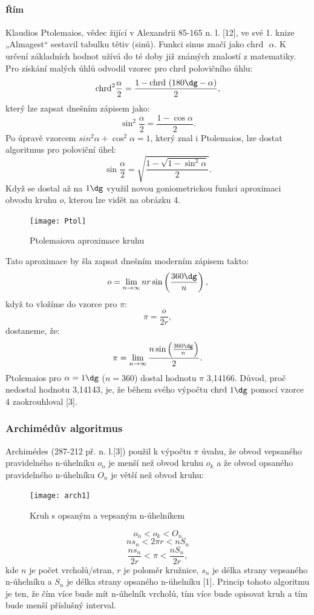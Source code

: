 \documentclass[rocnikovka]{gzwroc} %
\begin{document}
\paragraph{Řím}
Klaudios Ptolemaios, vědec žijící v Alexandrii 85-165 n. l. [12], ve své 1. knize „Almagest“ sestavil tabulku tětiv (sinů). Funkci sinus značí jako $\mathrm{chrd} \textrm{ }\alpha$. K určení základních hodnot užívá do té doby již známých znalostí z matematiky. Pro získání malých úhlů odvodil vzorec pro $\mathrm{chrd}$ polovičního úhlu:
$$
\mathrm{chrd}^2\frac{\alpha}{2}=\frac{1-\mathrm{chrd}\textrm{ }(180\dg-\alpha)}{2},
$$
který lze zapsat dnešním zápisem jako:
$$
\sin^2\frac{\alpha}{2}=\frac{1-\cos\alpha}{2}.
$$
Po úpravě vzorcem $sin^2\alpha+\cos^2\alpha=1$, který znal i Ptolemaios, lze dostat algoritmus pro poloviční úhel:
\begin{equation}
\sin\frac{\alpha}{2}=\sqrt{\frac{1-\sqrt{1-\sin^2\alpha}}{2}}.
\end{equation}
Když se dostal až na  $1\dg$ využil novou goniometrickou funkci aproximaci obvodu kruhu $o$, kterou lze vidět na obrázku 4.
\begin{figure}[!ht]
\texttt{[image: Ptol]}
\caption{Ptolemaiova aproximace kruhu}
\label{fig:kruh}
\end{figure}
Tato aproximace by šla zapsat dnešním moderním zápisem takto:
$$
o=\lim_{n\to\infty} nr\sin\left(\frac{360\dg}{n}\right),
$$
když to  vložíme do vzorce pro $\pi$:
$$
\pi=\frac{o}{2r},
$$
dostaneme, že:
\begin{equation}
\pi=\lim_{n\to\infty}\frac{n\sin\left(\frac{360\dg}{n}\right)}{2}.
\end{equation}
Ptolemaios pro $\alpha = 1\dg$ ($n=360$) dostal hodnotu $\pi$ 3,14166. Důvod, proč nedostal hodnotu 3,14143, je, že během svého výpočtu $\mathrm{chrd} \textrm{ }1\dg$ pomocí vzorce 4 zaokrouhloval [3].
\subsubsection{Archimédův algoritmus}
Archimédes (287-212 př. n. l.[3]) použil k výpočtu $\pi$ úvahu, že obvod vepsaného pravidelného n-úhelníku $o_n$ je menší než obvod kruhu $o_k$ a že obvod opsaného pravidelného n-úhelníku $O_n$ je větší než obvod kruhu:
\begin{figure}[!ht]
\texttt{[image: arch1]}
\caption{Kruh s opsaným a vepsaným n-úhelníkem}
\label{fig:kruh}
\end{figure}
$$ o_n<o_k<O_n $$
$$ ns_n<2\pi r<nS_n $$
\begin{equation}
\frac{ns_n}{2r}<\pi<\frac{nS_n}{2r},
\end{equation}
kde $n$ je počet vrcholů/stran, $r$ je poloměr kružnice, $s_n$ je délka strany vepsaného n-úhelníku a $S_n$ je délka strany opsaného n-úhelníku [1]. Princip tohoto algoritmu je ten, že čím více bude mít n-úhelník vrcholů, tím více bude opisovat kruh a tím bude menší příslušný interval.
\end{document}
